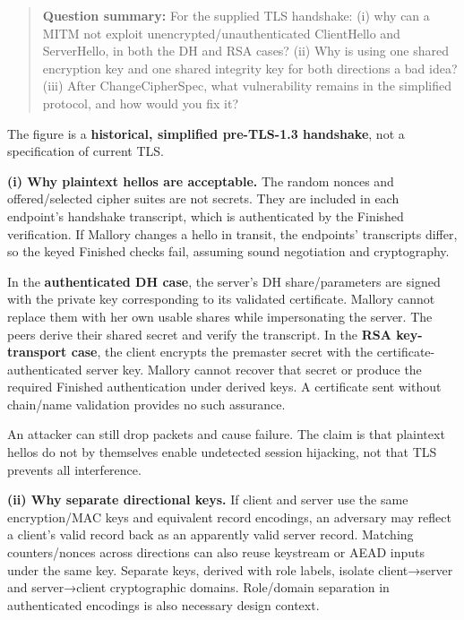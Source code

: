 \documentclass[11pt,a4paper]{article}
\begin{document}
\begin{quote}\small

\textbf{Question summary:} For the supplied TLS handshake: (i) why can a MITM not exploit unencrypted/\allowbreak{}unauthenticated ClientHello and ServerHello,\allowbreak{} in both the DH and RSA cases? (ii) Why is using one shared encryption key and one shared integrity key for both directions a bad idea? (iii) After ChangeCipherSpec,\allowbreak{} what vulnerability remains in the simplified protocol,\allowbreak{} and how would you fix it?



\end{quote}

The figure is a \textbf{historical,\allowbreak{} simplified pre-TLS-1.3 handshake},\allowbreak{} not a specification of current TLS.


\textbf{(i) Why plaintext hellos are acceptable.} The random nonces and offered/\allowbreak{}selected cipher suites are not secrets. They are included in each endpoint’s handshake transcript,\allowbreak{} which is authenticated by the Finished verification. If Mallory changes a hello in transit,\allowbreak{} the endpoints’ transcripts differ,\allowbreak{} so the keyed Finished checks fail,\allowbreak{} assuming sound negotiation and cryptography.


In the \textbf{authenticated DH case},\allowbreak{} the server’s DH share/\allowbreak{}parameters are signed with the private key corresponding to its validated certificate. Mallory cannot replace them with her own usable shares while impersonating the server. The peers derive their shared secret and verify the transcript. In the \textbf{RSA key-transport case},\allowbreak{} the client encrypts the premaster secret with the certificate-authenticated server key. Mallory cannot recover that secret or produce the required Finished authentication under derived keys. A certificate sent without chain/\allowbreak{}name validation provides no such assurance.


An attacker can still drop packets and cause failure. The claim is that plaintext hellos do not by themselves enable undetected session hijacking,\allowbreak{} not that TLS prevents all interference.


\textbf{(ii) Why separate directional keys.} If client and server use the same encryption/\allowbreak{}MAC keys and equivalent record encodings,\allowbreak{} an adversary may reflect a client’s valid record back as an apparently valid server record. Matching counters/\allowbreak{}nonces across directions can also reuse keystream or AEAD inputs under the same key. Separate keys,\allowbreak{} derived with role labels,\allowbreak{} isolate client→server and server→client cryptographic domains. Role/\allowbreak{}domain separation in authenticated encodings is also necessary design context.
\end{document}

